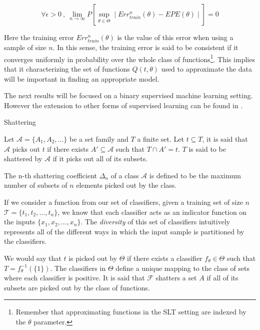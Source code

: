 \begin{equation}
\forall \epsilon > 0 \ , \ \lim_{n\to\infty} P\left[ \sup_{\theta \in \Theta} \mid Err^{n}_{train}(\theta)  - EPE(\theta) \mid \right]  = 0 
\end{equation}

Here the training error $Err^{n}_{train}(\theta)$ is the value of this error when using a sample of size $n$. In this sense, the training error is said to be consistent if it converges uniformly in probability over the whole class of functions\footnote{Remember that approximating functions in the SLT setting are indexed by the $\theta$ parameter.}. This implies that it characterizing the set of functions $Q(t,\theta)$ used to approximate the data will be important in finding an appropriate model. %

The next results will be focused on a binary supervised machine learning setting. However the extension to other forms of supervised learning can be found in \textcite{cherkassky-learning2007}.

\begin{definition}{Shattering}

Let $\mathcal {A}= \{A_1,A_{2},\dots \}$ be a set family and $T$ a finite set. Let $t \subseteq T$, it is said that $\mathcal {A}$ picks out $t$ if there exists $A' \subseteq \mathcal {A} $ such that $ T \cap A' = t$. $T$ is said to be shattered by $\mathcal {A}$ if it picks out all of its subsets.


\end{definition}

The n-th shattering coefficient $\Delta_n$ of a class $\mathcal {A}$ is defined to be the maximum number of subsets of $n$ elements picked out by the class.

If we consider a function from our set of classifiers, given a training set of size $n$
$\mathcal {T} = \{ t_1,t_2,...,t_n  \}$, we know that each classifier acts as an indicator function on the inputs $\{ x_1,x_2,...,x_n  \}$. The \textit{diversity} of this set of classifiers intuitively represents all of the different ways in which the input sample is partitioned by the classifiers.

We would say that $t$ is picked out by $\Theta$ if there exists a classifier $f_{\theta} \in \Theta$ such that $T = f_{\theta}^{-1}(\{1\})$. The classifiers in $\Theta$ define a unique mapping to the class of sets where each classifier is positive. It is said that $\mathcal {F}$ shatters a set $A$ if all of its subsets are picked out by the class of functions.

